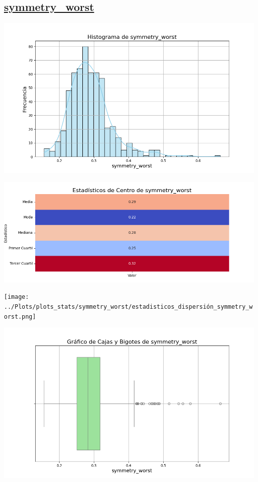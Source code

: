 \documentclass[a4paper, 12pt]{article}
\begin{document}
\subsection*{\underline{symmetry\_worst}}

	\includegraphics[width=\textwidth]{../Plots/plots_stats/symmetry_worst/histograma_symmetry_worst.png}




\includegraphics[width=\textwidth]{../Plots/plots_stats/symmetry_worst/estadisticas_centro_symmetry_worst.png}




\texttt{[image: ../Plots/plots\_stats/symmetry\_worst/estadisticos\_dispersión\_symmetry\_worst.png]}



\includegraphics[width=\textwidth]{../Plots/plots_stats/symmetry_worst/boxplot_symmetry_worst.png}
\end{document}

